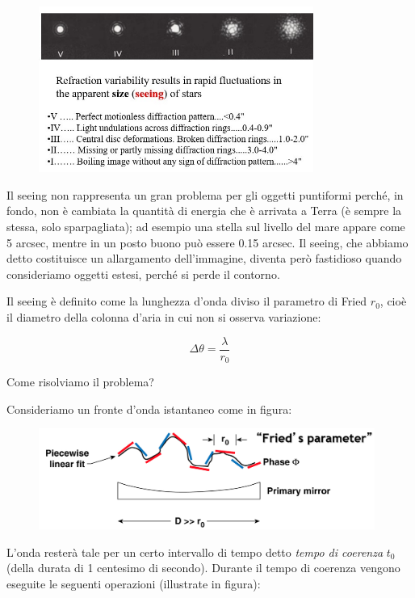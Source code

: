\begin{figure}[H]
    \centering
    \includegraphics[width=9cm]{20.jpg}
\end{figure}

Il seeing non rappresenta un gran problema per gli oggetti puntiformi perché, in fondo, non è cambiata la quantità di energia che è arrivata a Terra (è sempre la stessa, solo sparpagliata); ad esempio una stella sul livello del mare appare come 5 arcsec, mentre in un posto buono può essere 0.15 arcsec. Il seeing, che abbiamo detto costituisce un allargamento dell'immagine, diventa però fastidioso quando consideriamo oggetti estesi, perché si perde il contorno.

Il seeing è definito come la lunghezza d'onda diviso il parametro di Fried $r_0$, cioè il diametro della colonna d'aria in cui non si osserva variazione:

\begin{equation}
    \Delta\theta=\frac{\lambda}{r_0}
\end{equation}

Come risolviamo il problema?

Consideriamo un fronte d'onda istantaneo come in figura:

\begin{figure}[H]
    \centering
    \includegraphics[width=11cm]{immagini/tempo_di_coerenza.png}
\end{figure}

L'onda resterà tale per un certo intervallo di tempo detto \textit{tempo di coerenza} $t_0$ (della durata di 1 centesimo di secondo). Durante il tempo di coerenza vengono eseguite le seguenti operazioni (illustrate in figura):

